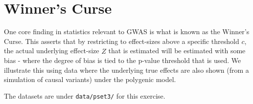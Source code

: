 \documentclass{pset}
\date{6/1/2025}
\begin{document}
\maketitle

\section*{Winner's Curse}

One core finding in statistics relevant to GWAS is what is known as the Winner's Curse. This asserts that by restricting to effect-sizes above a specific threshold $c$, the actual underlying effect-size $\hat{Z}$ that is estimated will be estimated with some bias - where the degree of bias is tied to the p-value threshold that is used. We illustrate this using data where the underlying true effects are also shown (from a simulation of causal variants) under the polygenic model. 

The datasets are under \texttt{data/pset3/} for this exercise.
\end{document}
